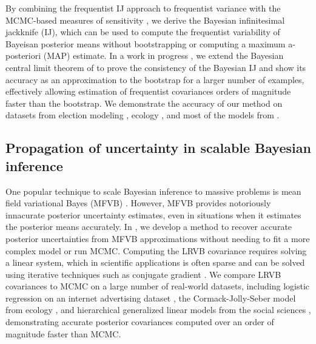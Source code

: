 By combining the frequentist IJ \citep{jaeckel:1972:infinitesimal,
shao:2012:jackknife, giordano:2019:ij} approach to frequentist variance with the
MCMC-based measures of sensitivity \citep{gustafson:2012:localrobustnessbook,
giordano:2018:covariances}, we derive the Bayesian infinitesimal jackknife (IJ),
which can be used to compute the frequentist variability of Bayeisan posterior
means without bootstrapping or computing a maximum a-posteriori (MAP) estimate.
In a work in progress \citep{giordano:2020:bayesij}, we extend the Bayesian
central limit theorem of \citet{lehman:1983:pointestimation,
kass:1990:posteriorexpansions} to prove the consistency of the Bayesian IJ and
show its accuracy as an approximation to the bootstrap for a larger number of
examples, effectively allowing estimation of frequentist covariances orders of
magnitude faster than the bootstrap.  We demonstrate the accuracy of our method
on datasets from election modeling \citep{economist:2020:election}, ecology
\citep{kery:2011:bayesian}, and most of the models from \citep{gelman:2006:arm,
stan-examples:2017}.



\subsection*{Propagation of uncertainty in scalable Bayesian inference}

One popular technique to scale Bayesian inference to massive problems is mean
field variational Bayes (MFVB) \citep{wainwright:2008:graphical,
blei:2017:variational, regier:2019:cataloging}.  However, MFVB provides
notoriously innacurate posterior uncertainty estimates, even in situations when
it estimates the posterior means accurately. In
\citep{giordano:2018:covariances}, we develop a method to recover accurate
posterior uncertainties from MFVB approximations without needing to fit a more
complex model or run MCMC. Computing the LRVB covariance requires solving a
linear system, which in scientific applications is often sparse and can be
solved using iterative techniques such as conjugate gradient \citep[Chapter
5]{nocedal:2006:numerical}.  We compare LRVB covariances to MCMC on a large
number of real-world datasets, including logistic regression on an internet
advertising dataset \citep{criteo:2014:dataset}, the Cormack-Jolly-Seber model
from ecology \citep{kery:2011:bayesian}, and hierarchical generalized linear
models from the social sciences \citep{gelman:2006:arm}, demonstrating accurate
posterior covariances computed over an order of magnitude faster than MCMC.



